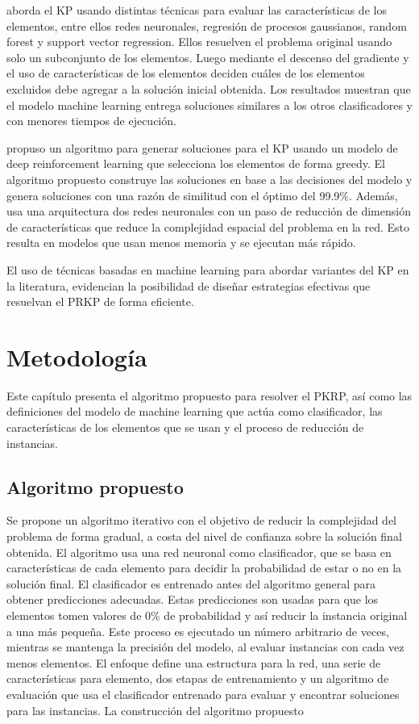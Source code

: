 \documentclass[spanish, a4paper, 12pt, openany,final]{book}
\begin{document}
\cite{rezoug_application_2022} aborda el KP usando distintas técnicas para evaluar las características de los elementos, entre ellos redes neuronales, regresión de procesos gaussianos, random forest y support vector regression. Ellos resuelven el problema original usando solo un subconjunto de los elementos. Luego mediante el descenso del gradiente y el uso de características de los elementos deciden cuáles de los elementos excluidos debe agregar a la solución inicial obtenida. Los resultados muestran que el modelo machine learning entrega soluciones similares a los otros clasificadores y con menores tiempos de ejecución.

\cite{afshar_state_2020} propuso un algoritmo para generar soluciones para el KP usando un modelo de deep reinforcement learning que selecciona los elementos de forma greedy. El algoritmo propuesto construye las soluciones en base a las decisiones del modelo y genera soluciones con una razón de similitud con el óptimo del 99.9\%. Además, usa una arquitectura dos redes neuronales con un paso de reducción de dimensión de características que reduce la complejidad espacial del problema en la red. Esto resulta en modelos que usan menos memoria y se ejecutan más rápido.

El uso de técnicas basadas en machine learning para abordar variantes del KP en la literatura, evidencian la posibilidad de diseñar estrategias efectivas que resuelvan el PRKP de forma eficiente.
 

\chapter{Metodología}

Este capítulo presenta el algoritmo propuesto para resolver el PKRP, así como las definiciones del modelo de machine learning que actúa como clasificador, las características de los elementos que se usan y el proceso de reducción de instancias.

\section{Algoritmo propuesto}

Se propone un algoritmo iterativo con el objetivo de reducir la complejidad del problema de forma gradual, a costa del nivel de confianza sobre la solución final obtenida. El algoritmo usa una red neuronal como clasificador, que se basa en características de cada elemento para decidir la probabilidad de estar o no en la solución final. El clasificador es entrenado antes del algoritmo general para obtener predicciones adecuadas. Estas predicciones son usadas para que los elementos tomen valores de 0\% de probabilidad y así reducir la instancia original a una más pequeña. Este proceso es ejecutado un número arbitrario de veces, mientras se mantenga la precisión del modelo, al evaluar instancias con cada vez menos elementos. El enfoque define una estructura para la red, una serie de características para elemento, dos etapas de entrenamiento y un algoritmo de evaluación que usa el clasificador entrenado para evaluar y encontrar soluciones para las instancias. La construcción del algoritmo propuesto
\end{document}
